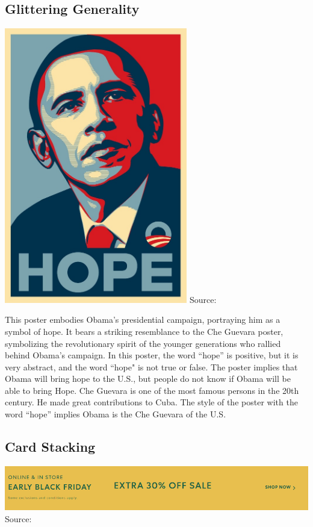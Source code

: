 \documentclass[12pt, a4paper]{article}
\begin{document}
\subsection*{Glittering Generality}
\includegraphics[width=0.6\textwidth]{Figure.5.1.png}
Source: \cite{Jordan}

This poster embodies Obama's presidential campaign, portraying him as a symbol of hope. It bears a striking resemblance to the Che Guevara poster, symbolizing the revolutionary spirit of the younger generations who rallied behind Obama's campaign. In this poster, the word “hope” is positive, but it is very abstract, and the word ``hope" is not true or false. The poster implies that Obama will bring hope to the U.S., but people do not know if Obama will be able to bring Hope. Che Guevara is one of the most famous persons in the 20th century. He made great contributions to Cuba. The style of the poster with the word “hope” implies Obama is the Che Guevara of the U.S.


\subsection*{Card Stacking}
\includegraphics[width=1\textwidth]{Figure.5.2.png}
Source: \cite{Roots_Corporation_2023}
\end{document}
